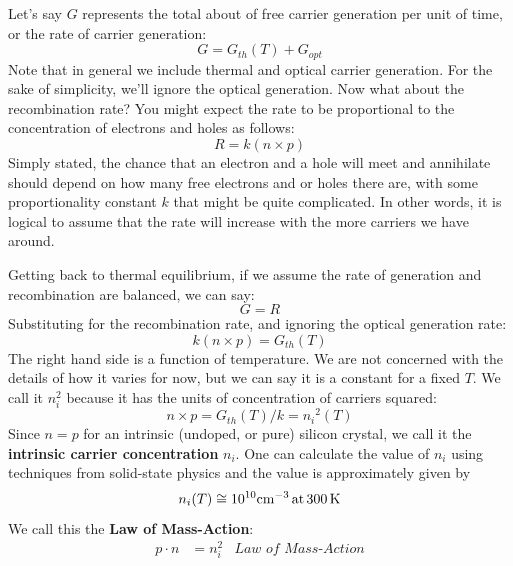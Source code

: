 Let’s say $G$ represents the total about of free carrier generation per unit of time, or the rate of carrier generation:
    \begin{equation}
        G = {G_{th}}(T) + {G_{opt}}
    \end{equation}
Note that in general we include thermal and optical carrier generation.  For the sake of simplicity, we’ll ignore the optical generation.  Now what about the recombination rate?  You might expect the rate to be proportional to the concentration of electrons and holes as follows:
    \begin{equation}
        R = k(n \times p) 
    \end{equation}
Simply stated, the chance that an electron and a hole will meet and annihilate should depend on how many free electrons and or holes there are, with some proportionality constant $k$ that might be quite complicated.  In other words, it is logical to assume that the rate will increase with the more carriers we have around. 

Getting back to thermal equilibrium, if we assume the rate of generation and recombination are balanced, we can say:
    \begin{equation}
        G = R
    \end{equation}
Substituting for the recombination rate, and ignoring the optical generation rate:
    \begin{equation}
        k(n \times p) = {G_{th}}(T)
    \end{equation}
The right hand side is a function of temperature.  We are not concerned with the details of how it varies for now, but we can say it is a constant for a fixed $T$.  We call it $n_i^2$ because it has the units of concentration of carriers squared:
    \begin{equation}
        n \times p = {G_{th}}(T)/k = {n_i}^2(T)
    \end{equation}
Since $n=p$ for an intrinsic (undoped, or pure) silicon crystal, we call it the \textbf{intrinsic carrier concentration} $n_i$.  One can calculate the value of $n_i$ using techniques from solid-state physics and the value is approximately given by 
    \begin{equation}
        {n_i}(T) \cong {10^{10}}{\rm{c}}{{\rm{m}}^{ - 3}}\,{\rm{at}}\,300\,{\rm{K}}
    \end{equation}
We call this the \textbf{Law of Mass-Action}:
    \begin{align}
        p \cdot n &= n_i^2 &\textit{Law of Mass-Action}
    \end{align}
